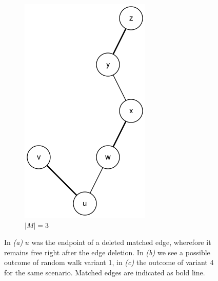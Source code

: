\documentclass{article}      %
\begin{document}
\begin{figure}
\begin{subfigure}[b]{0.25\textwidth}
		\includegraphics[width=\textwidth]{img/graph3.png}
		\caption{$|M|=3$}
		\label{fig:rw-aug-c}
	\end{subfigure}
	\caption{In \emph{(a)} $u$ was the endpoint of a deleted matched edge, wherefore it remains free right after the edge deletion. In \emph{(b)} we see a possible outcome of random walk variant 1, in \emph{(c)} the outcome of variant 4 for the same scenario. Matched edges are indicated as bold line.}
	\label{fig:rw-augs}
\end{figure}
\end{document}
